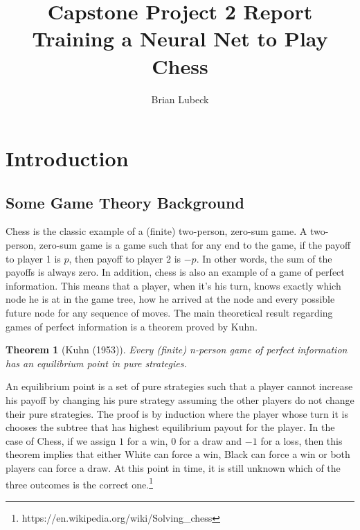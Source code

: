 \documentclass[12pt]{article}
\title{Capstone Project 2 Report\\ Training a Neural Net to Play Chess}
\author{Brian Lubeck}
\newtheorem*{theorem*}{Theorem}
\begin{document}
	\maketitle

\section{Introduction}

\subsection{Some Game Theory Background}

Chess is the classic example of a (finite) two-person, zero-sum game. A two-person, zero-sum game is a game such that for any end to the game, if the payoff to player 1 is $p$, then payoff to player 2 is $-p$. In other words, the sum of the payoffs is always zero. In addition, chess is also an example of a game of perfect information. This means that a player, when it's his turn, knows exactly which node he is at in the game tree, how he arrived at the node and every possible future node for any sequence of moves. The main theoretical result regarding games of perfect information is a theorem proved by Kuhn. \cite{hart}

\begin{theorem*}[Kuhn (1953)] Every (finite) n-person game of perfect information has an equilibrium point in pure strategies.
\end{theorem*}

An equilibrium point is a set of pure strategies such that a player cannot increase his payoff by changing his pure strategy assuming the other players do not change their pure strategies. The proof is by induction where the player whose turn it is chooses the subtree that has highest equilibrium payout for the player. In the case of Chess, if we assign $1$ for a win, $0$ for a draw and $-1$ for a loss, then this theorem implies that either White can force a win, Black can force a win or both players can force a draw. At this point in time, it is still unknown which of the three outcomes is the correct one.\footnote{https://en.wikipedia.org/wiki/Solving\_chess}
\end{document}

